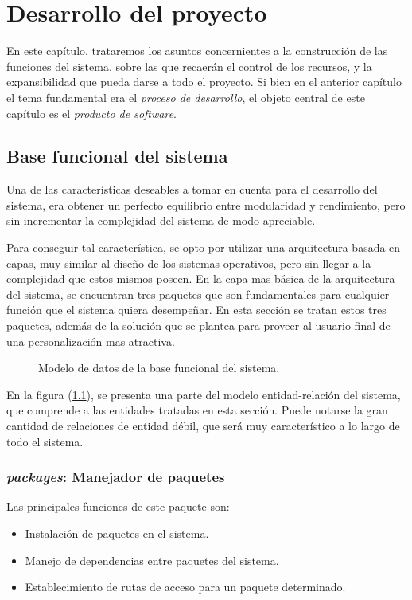 \chapter{Desarrollo del proyecto}

En este capítulo, trataremos los asuntos concernientes a la construcción de las
funciones del sistema, sobre las que recaerán el control de los recursos, y la
expansibilidad que pueda darse a todo el proyecto. Si bien en el anterior
capítulo el tema fundamental era el \emph{proceso de desarrollo}, el objeto
central de este capítulo es el \emph{producto de software}.

\section{Base funcional del sistema}
Una de las características deseables a tomar en cuenta para el desarrollo del
sistema, era obtener un perfecto equilibrio entre modularidad y rendimiento,
pero sin incrementar la complejidad del sistema de modo apreciable.

Para conseguir tal característica, se opto por utilizar una arquitectura basada
en capas, muy similar al diseño de los sistemas operativos, pero sin llegar a la
complejidad que estos mismos poseen. En la capa mas básica de la arquitectura
del sistema, se encuentran tres paquetes que son fundamentales para cualquier
función que el sistema quiera desempeñar. En esta sección se tratan estos tres
paquetes, además de la solución que se plantea para proveer al usuario final de
una personalización mas atractiva.

\begin{figure}
\centering

\caption{Modelo de datos de la base funcional del sistema.}
\label{modelo1}
\end{figure}

En la figura (\ref{modelo1}), se presenta una parte del modelo entidad-relación
del sistema, que comprende a las entidades tratadas en esta sección. Puede
notarse la gran cantidad de relaciones de entidad débil, que será muy
característico a lo largo de todo el sistema.

\subsection{\emph{packages}: Manejador de paquetes}
Las principales funciones de este paquete son:

\begin{itemize}
\item Instalación de paquetes en el sistema.
\item Manejo de dependencias entre paquetes del sistema.
\item Establecimiento de rutas de acceso para un paquete determinado.
\end{itemize}

